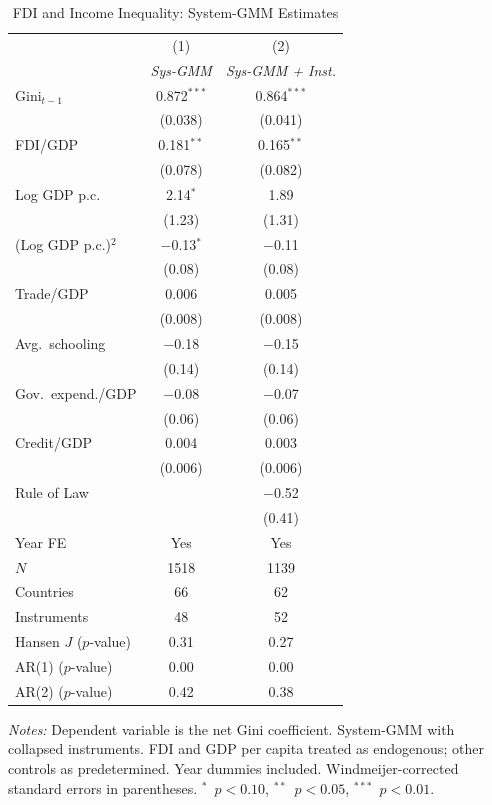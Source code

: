 \documentclass[12pt,a4paper]{article}
\begin{document}
\begin{table}[htbp]
\centering
\caption{FDI and Income Inequality: System-GMM Estimates}
\label{tab:gmm}
\begin{threeparttable}
\begin{tabular}{@{} l cc @{}}
\toprule
 & (1) & (2) \\
 & \textit{Sys-GMM} & \textit{Sys-GMM + Inst.} \\
\midrule
Gini$_{t-1}$   & 0.872$^{***}$ & 0.864$^{***}$ \\
               & (0.038)       & (0.041)       \\[4pt]
FDI/GDP        & 0.181$^{**}$  & 0.165$^{**}$  \\
               & (0.078)       & (0.082)       \\[4pt]
Log GDP p.c.   & 2.14$^{*}$    & 1.89          \\
               & (1.23)        & (1.31)        \\[4pt]
(Log GDP p.c.)$^{2}$ & $-$0.13$^{*}$ & $-$0.11 \\
               & (0.08)        & (0.08)        \\[4pt]
Trade/GDP      & 0.006         & 0.005         \\
               & (0.008)       & (0.008)       \\[4pt]
Avg.\ schooling & $-$0.18      & $-$0.15       \\
               & (0.14)        & (0.14)        \\[4pt]
Gov.\ expend./GDP & $-$0.08   & $-$0.07       \\
               & (0.06)        & (0.06)        \\[4pt]
Credit/GDP     & 0.004         & 0.003         \\
               & (0.006)       & (0.006)       \\[4pt]
Rule of Law    &               & $-$0.52       \\
               &               & (0.41)        \\[4pt]
\midrule
Year FE        & Yes & Yes \\
$N$            & 1518 & 1139 \\
Countries      & 66   & 62   \\
Instruments    & 48   & 52   \\
Hansen $J$ ($p$-value) & 0.31 & 0.27 \\
AR(1) ($p$-value)      & 0.00 & 0.00 \\
AR(2) ($p$-value)      & 0.42 & 0.38 \\
\bottomrule
\end{tabular}
\begin{tablenotes}[flushleft]\footnotesize
\item \textit{Notes:} Dependent variable is the net Gini coefficient.  System-GMM with collapsed instruments.  FDI and GDP per capita treated as endogenous; other controls as predetermined.  Year dummies included.  Windmeijer-corrected standard errors in parentheses.  $^{*}$~$p<0.10$, $^{**}$~$p<0.05$, $^{***}$~$p<0.01$.
\end{tablenotes}
\end{threeparttable}
\end{table}
\end{document}
